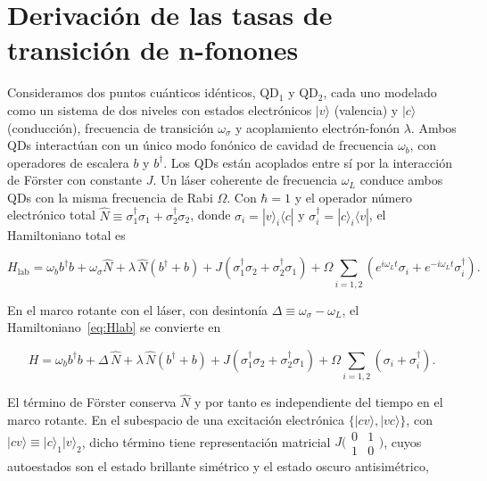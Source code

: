 \appendix
\chapter{Derivación de las tasas de transición de n-fonones}\label{AnexoA}

Consideramos dos puntos cuánticos idénticos, QD$_1$ y QD$_2$, cada uno modelado como un sistema de dos niveles con estados electrónicos $|v\rangle$ (valencia) y $|c\rangle$ (conducción), frecuencia de transición $\omega_\sigma$ y acoplamiento electrón-fonón $\lambda$. Ambos QDs interactúan con un único modo fonónico de cavidad de frecuencia $\omega_b$, con operadores de escalera $b$ y $b^\dagger$. Los QDs están acoplados entre sí por la interacción de Förster con constante $J$. Un láser coherente de frecuencia $\omega_L$ conduce ambos QDs con la misma frecuencia de Rabi $\Omega$. Con $\hbar = 1$ y el operador  número electrónico total $\hat{N} \equiv \sigma_1^\dagger\sigma_1 + \sigma_2^\dagger\sigma_2$, donde $\sigma_i = |v\rangle_i\!\langle c|$ y $\sigma_i^\dagger = |c\rangle_i\!\langle v|$, el Hamiltoniano total es

\begin{equation}
	H_\mathrm{lab}
	= \omega_b b^\dagger b
	+ \omega_\sigma \hat{N}
	+ \lambda\,\hat{N}(b^\dagger + b)
	+ J\!\left(\sigma_1^\dagger\sigma_2 + \sigma_2^\dagger\sigma_1\right)
	+ \Omega\sum_{i=1,2}\!\left(e^{i\omega_L t}\sigma_i
	+ e^{-i\omega_L t}\sigma_i^\dagger\right).
	\label{eq:Hlab}
\end{equation}

En el marco rotante con el láser, con desintonía $\Delta \equiv \omega_\sigma - \omega_L$, el Hamiltoniano~\eqref{eq:Hlab} se convierte en

\begin{equation}
	H = \omega_b b^\dagger b
	+ \Delta\,\hat{N}
	+ \lambda\,\hat{N}(b^\dagger + b)
	+ J\!\left(\sigma_1^\dagger\sigma_2 + \sigma_2^\dagger\sigma_1\right)
	+ \Omega\sum_{i=1,2}\!\left(\sigma_i + \sigma_i^\dagger\right).
	\label{eq:H}
\end{equation}

El término de Förster conserva $\hat{N}$ y por tanto es independiente del tiempo en el marco rotante. En el subespacio de una excitación electrónica $\{|cv\rangle,|vc\rangle\}$, con $|cv\rangle \equiv |c\rangle_1|v\rangle_2$, dicho término tiene representación matricial $J\bigl(\begin{smallmatrix}0&1\\1&0\end{smallmatrix}\bigr)$, cuyos autoestados son el estado brillante simétrico y el estado oscuro antisimétrico,


